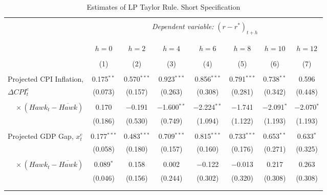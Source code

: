\documentclass[11pt]{article}
\begin{document}
\begin{table}[!hbtp]\centering \footnotesize
  \begin{threeparttable} \centering
    \caption{Estimates of LP Taylor Rule. Short Specification}
    \label{tab:LP_short}
    \begin{tabular}{@{\extracolsep{5pt}}lccccccc} 
      \\[-1.8ex]\hline 
      \hline \\[-1.8ex] 
       & \multicolumn{7}{c}{\textit{Dependent variable:} $\left(r-r^*\right)_{t+h}$} \\  
       \\[-1.8ex]
      \cline{2-8} 
      \\[-1.8ex] & $h=0$ & $h=2$ & $h=4$ & $h=6$ & $h=8$ & $h=10$ & $h=12$ \\ 
      \\[-1.8ex] & (1) & (2) & (3) & (4) & (5) & (6) & (7)\\ 
      \hline \\[-1.8ex] 
      Projected CPI Inflation, & 0.175$^{**}$ & 0.570$^{***}$ & 0.923$^{***}$ & 0.856$^{***}$ & 0.791$^{***}$ & 0.738$^{**}$ & 0.596 \\ 
        $\Delta\mathit{CPI}_t^e$ & (0.073) & (0.157) & (0.263) & (0.308) & (0.281) & (0.342) & (0.448) \\ 
       & & & & & & & \\ 
       $\quad \times \left(\mathit{Hawk}_t-\overline{\mathit{Hawk}}\right)$ & 0.170 & $-$0.191 & $-$1.600$^{**}$ & $-$2.224$^{**}$ & $-$1.741 & $-$2.091$^{*}$ & $-$2.070$^{*}$ \\ 
       & (0.186) & (0.530) & (0.749) & (1.094) & (1.122) & (1.193) & (1.193) \\ 
       & & & & & & & \\ 
       Projected GDP Gap, $x_t^e$ & 0.177$^{***}$ & 0.483$^{***}$ & 0.709$^{***}$ & 0.815$^{***}$ & 0.733$^{***}$ & 0.653$^{**}$ & 0.633$^{*}$ \\ 
       & (0.058) & (0.180) & (0.157) & (0.160) & (0.176) & (0.271) & (0.325) \\ 
       & & & & & & & \\ 
       $\quad \times \left(\mathit{Hawk}_t-\overline{\mathit{Hawk}}\right)$ & 0.089$^{*}$ & 0.158 & 0.002 & $-$0.122 & $-$0.013 & 0.217 & 0.263 \\ 
       & (0.046) & (0.156) & (0.244) & (0.302) & (0.320) & (0.308) & (0.308) \\ 
       & & & & & & & \\ 
       \hline \\[-1.8ex] 

\end{tabular}
\end{threeparttable}
\end{table}
\end{document}
